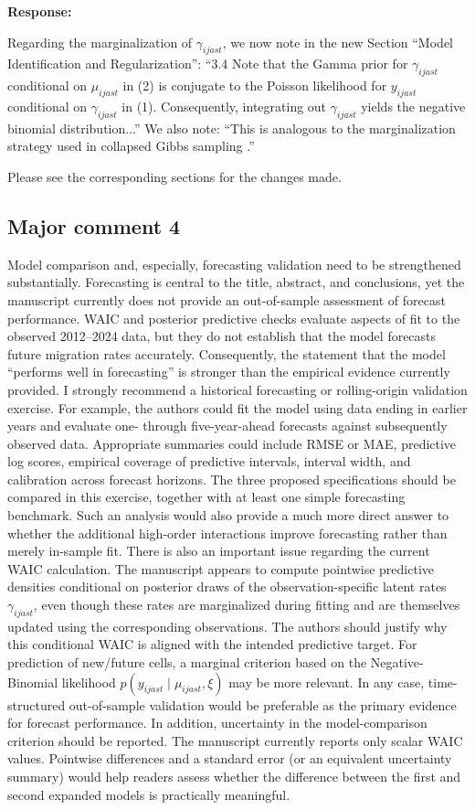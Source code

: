 \documentclass[11pt,a4paper]{article}
\newlength{\replyspace}
\newenvironment{response}{\par\addvspace{\replyspace}\nopagebreak\textbf{\textcolor{replyblue}{Response:}}\par\begingroup\color{replyblue}}{\par\endgroup\vspace{\replyspace}}
\newcommand{\refcomment}[2]{\par\Needspace{5\baselineskip}\subsection*{#1}#2\par}
\begin{document}
\begin{response}
Regarding the marginalization of $\gamma_{ijast}$, we now note in the new Section ``Model Identification and Regularization'': ``3.4 Note that the Gamma prior for 
$\gamma_{ijast}$ conditional on $\mu_{ijast}$ in (2) is conjugate to the Poisson likelihood for $y_{ijast}$ conditional on $\gamma_{ijast}$ in (1). Consequently, integrating out $\gamma_{ijast}$ yields the negative binomial distribution...'' We also note: ``This is analogous to the marginalization strategy used in collapsed Gibbs sampling \citep{liu1994collapsed}.''

Please see the corresponding sections for the changes made.

\end{response}

\refcomment{Major comment 4}{
Model comparison and, especially, forecasting validation need to be strengthened substantially. Forecasting is central to the title, abstract, and conclusions, yet the manuscript currently does not provide an out-of-sample assessment of forecast performance. WAIC and posterior predictive checks evaluate aspects of fit to the observed 2012--2024 data, but they do not establish that the model forecasts future migration rates accurately. Consequently, the statement that the model ``performs well in forecasting'' is stronger than the empirical evidence currently provided. I strongly recommend a historical forecasting or rolling-origin validation exercise. For example, the authors could fit the model using data ending in earlier years and evaluate one- through five-year-ahead forecasts against subsequently observed data. Appropriate summaries could include RMSE or MAE, predictive log scores, empirical coverage of predictive intervals, interval width, and calibration across forecast horizons. The three proposed specifications should be compared in this exercise, together with at least one simple forecasting benchmark. Such an analysis would also provide a much more direct answer to whether the additional high-order interactions improve forecasting rather than merely in-sample fit. There is also an important issue regarding the current WAIC calculation. The manuscript appears to compute pointwise predictive densities conditional on posterior draws of the observation-specific latent rates $\gamma_{ijast}$, even though these rates are marginalized during fitting and are themselves updated using the corresponding observations. The authors should justify why this conditional WAIC is aligned with the intended predictive target. For prediction of new/future cells, a marginal criterion based on the Negative-Binomial likelihood $p(y_{ijast}\mid\mu_{ijast},\xi)$ may be more relevant. In any case, time-structured out-of-sample validation would be preferable as the primary evidence for forecast performance. In addition, uncertainty in the model-comparison criterion should be reported. The manuscript currently reports only scalar WAIC values. Pointwise differences and a standard error (or an equivalent uncertainty summary) would help readers assess whether the difference between the first and second expanded models is practically meaningful.

}
\end{document}
